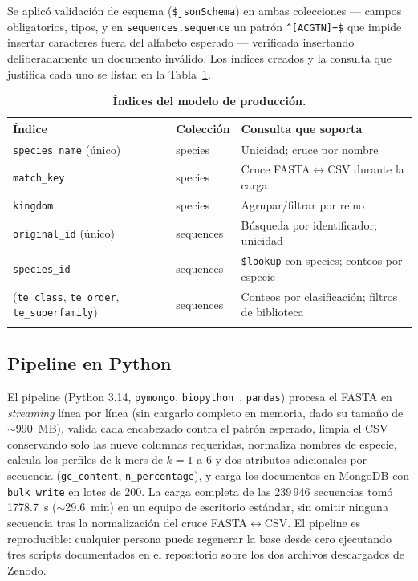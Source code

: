 \documentclass[pdflatex,sn-vancouver-num,lineno,referee]{sn-jnl}
\begin{document}
Se aplicó validación de esquema (\texttt{\$jsonSchema}) en ambas colecciones
--- campos obligatorios, tipos, y en \texttt{sequences.sequence} un patrón
\texttt{\^{}[ACGTN]+\$} que impide insertar caracteres fuera del alfabeto
esperado --- verificada insertando deliberadamente un documento inválido. Los
índices creados y la consulta que justifica cada uno se listan en la
Tabla~\ref{tab:indices}.

\begin{table}[!ht]
\caption{\textbf{Índices del modelo de producción.}}
\begin{tabular*}{\textwidth}{@{\extracolsep\fill}p{3.4cm}p{2.0cm}p{6.2cm}@{}}
\toprule
Índice & Colección & Consulta que soporta \\
\midrule
\texttt{species\_name} (único) & species & Unicidad; cruce por nombre \\
\texttt{match\_key} & species & Cruce FASTA$\leftrightarrow$CSV durante la carga \\
\texttt{kingdom} & species & Agrupar/filtrar por reino \\
\texttt{original\_id} (único) & sequences & Búsqueda por identificador; unicidad \\
\texttt{species\_id} & sequences & \texttt{\$lookup} con species; conteos por especie \\
(\texttt{te\_class}, \texttt{te\_order}, \texttt{te\_superfamily}) & sequences & Conteos por clasificación; filtros de biblioteca \\
\botrule
\end{tabular*}
\label{tab:indices}
\end{table}

\subsection{Pipeline en Python}

El pipeline (Python 3.14, \texttt{pymongo}, \texttt{biopython}~\cite{cock2009biopython},
\texttt{pandas}) procesa el FASTA en \emph{streaming} línea por línea (sin
cargarlo completo en memoria, dado su tamaño de $\sim$990~MB), valida cada
encabezado contra el patrón esperado, limpia el CSV conservando solo las nueve
columnas requeridas, normaliza nombres de especie, calcula los perfiles de
k-mers de $k=1$ a $6$ y dos atributos adicionales por secuencia
(\texttt{gc\_content}, \texttt{n\_percentage}), y carga los documentos en
MongoDB con \texttt{bulk\_write} en lotes de 200. La carga completa de las
239\,946 secuencias tomó 1778.7~s ($\sim$29.6~min) en un equipo de escritorio
estándar, sin omitir ninguna secuencia tras la normalización del cruce
FASTA$\leftrightarrow$CSV. El pipeline es reproducible: cualquier persona
puede regenerar la base desde cero ejecutando tres scripts documentados en el
repositorio sobre los dos archivos descargados de Zenodo.
\end{document}
